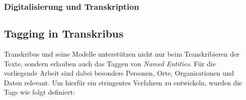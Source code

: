 \documentclass[12pt, a4paper, ngerman, bidi=default]{article}
\begin{document}
    \subsubsection{Digitalisierung und Transkription}
    
    \subsection{Tagging in Transkribus} 

    Transkribus und seine Modelle unterstützen nicht nur beim Transkribieren der Texte, sondern erlauben auch das Taggen von \textit{Named Entities}.  
    Für die vorliegende Arbeit sind dabei besonders Personen, Orte, Organisationen und Daten relevant.  
    Um hierfür ein stringentes Verfahren zu entwickeln, wurden die Tags wie folgt definiert:
    
\end{document}
